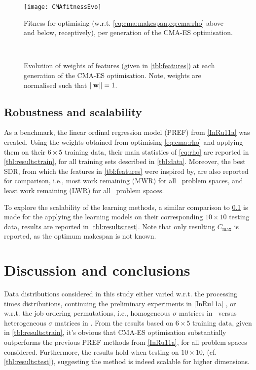 \begin{figure} 
	\texttt{[image: CMAfitnessEvo]}
	\caption{Fitness for optimising (w.r.t. \cref{eq:cma:makespan,eq:cma:rho} above and below, receptively), per generation of the CMA-ES optimisation.}\label{fig:cma:fit}
\end{figure}

\begin{figure*} 
	\\
	\caption{Evolution of weights of features (given in \cref{tbl:features}) at each generation of the CMA-ES optimisation. Note, weights are normalised such that $\lVert\mathbf{w}\rVert=1$.}\label{fig:cma:wei}
\end{figure*}


\subsection{Robustness and  scalability}\label{sec:expr:robust} 
As a benchmark, the linear ordinal regression model (PREF) from \cref{InRu11a} 
was created.
Using the weights obtained from optimising \cref{eq:cma:rho} and applying them on their  $6\times5$ training data, their main statistics of \cref{eq:rho} are reported in \cref{tbl:results:train}, for all training sets described in \cref{tbl:data}. Moreover, the best SDR, from which the features in \cref{tbl:features} were inspired by, are also reported for comparison, i.e., most work remaining (MWR) for all \JSP\ problem spaces, and least work remaining (LWR) for all \FSP\ problem spaces.

To explore the scalability of the learning methods, a similar comparison to \cref{sec:expr:robust} is made for the applying the learning models on their corresponding $10\times10$ testing data, results are reported in \cref{tbl:results:test}. Note that only resulting $C_{\max}$ is reported, as the optimum makespan is not known. 

{\setlength{\tabcolsep}{3pt}
	
	}

\section{Discussion and conclusions}\label{sec:disc}
Data distributions considered in this study either varied 
w.r.t. the processing times distributions, continuing the preliminary 
experiments in  \cref{InRu11a} , or 
w.r.t. the job ordering permutations, i.e., homogeneous $\sigma$ matrices in \FSP\ versus heterogeneous $\sigma$ matrices in \JSP . 
From the results based on $6\times5$ training data, given  in 
\cref{tbl:results:train}, it's obvious that CMA-ES optimisation substantially 
outperforms the previous PREF methods from \cref{InRu11a}, for all problem 
spaces considered. Furthermore, the results hold when testing on $10\times10$, 
(cf. \cref{tbl:results:test}), suggesting the method is indeed  scalable for 
higher dimensions. 

